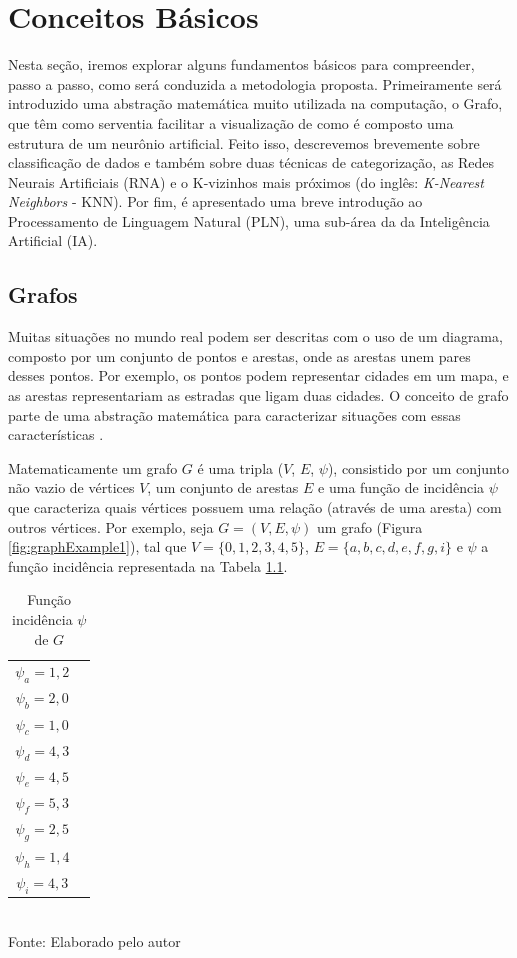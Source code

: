 \chapter{Conceitos Básicos} %
Nesta seção, iremos explorar alguns fundamentos básicos para compreender, passo a passo, como será conduzida a metodologia proposta. Primeiramente será introduzido uma abstração matemática muito utilizada na computação, o Grafo, que têm como serventia facilitar a visualização de como é composto uma estrutura de um neurônio artificial. Feito isso, descrevemos brevemente sobre classificação de dados e também sobre duas técnicas de categorização, as Redes Neurais Artificiais (RNA) e o K-vizinhos mais próximos (do inglês: \textit{K-Nearest Neighbors} - KNN). Por fim, é apresentado uma breve introdução ao Processamento de Linguagem Natural (PLN), uma sub-área da da Inteligência Artificial (IA).

\section{Grafos} %
Muitas situações no mundo real podem ser descritas com o uso de um diagrama, composto por um conjunto de pontos e arestas, onde as arestas unem pares desses pontos. Por exemplo, os pontos podem representar cidades em um mapa, e as arestas representariam as estradas que ligam duas cidades. O conceito de grafo parte de uma abstração matemática para caracterizar situações com essas características \citep{Bondy1976}.

Matematicamente um grafo $G$ é uma tripla ($V$, $E$, $\psi$), consistido por um conjunto não vazio de vértices $V$, um conjunto de arestas $E$ e uma função de incidência $\psi$ que caracteriza quais vértices possuem uma relação (através de uma aresta) com outros vértices. Por exemplo, seja $G = (V, E, \psi)$ um grafo (Figura \ref{fig:graphExample1}), tal que $V = \{0, 1, 2, 3, 4, 5\}$, $E = \{a, b, c, d, e, f, g, i\}$ e $\psi$ a função incidência representada na Tabela \ref{tab:graphExample1}.

\begin{table}[ht!]
\caption{Função incidência $\psi$ de $G$}
\label{tab:graphExample1}
\centering
\begin{tabular}{| c | c |}
\hline
    $\psi_a = 1,2$\\ 
    $\psi_b = 2,0$\\ 
    $\psi_c = 1,0$\\ 
    $\psi_d = 4,3$\\
    $\psi_e = 4,5$\\
    $\psi_f = 5,3$\\
    $\psi_g = 2,5$\\
    $\psi_h = 1,4$\\
    $\psi_i = 4,3$\\
\hline
\end{tabular}
{\fontsize{11pt}{\baselineskip}\selectfont
\\Fonte: Elaborado pelo autor
}
\end{table}

